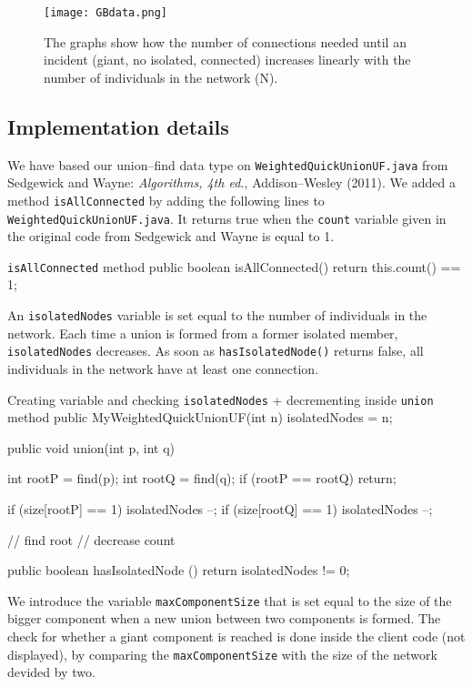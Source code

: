 \documentclass{tufte-handout}
\begin{document}
\begin{figure}
	\texttt{[image: GBdata.png]}
	\caption{The graphs show how the number of connections needed until an incident (giant, no isolated, connected) increases linearly with the number of individuals in the network (N).}
	\label{fig:data}
\end{figure}

\subsection{Implementation details}

We have based our union--find data type on {\tt WeightedQuickUnionUF.java} from Sedgewick and Wayne: {\em Algorithms, 4th ed.}, Addison--Wesley (2011).
We added a method {\tt isAllConnected} by adding the following lines to {\tt WeightedQuickUnionUF.java}. It returns true when the {\tt count} variable given in the original code from Sedgewick and Wayne is equal to 1.

\begin{sexylisting}{{\tt isAllConnected} method}
public boolean isAllConnected() {
    return this.count() == 1; }
\end{sexylisting}

An {\tt isolatedNodes} variable is set equal to the number of individuals in the network.
Each time a union is formed from a former isolated member, {\tt isolatedNodes} decreases.
As soon as {\tt hasIsolatedNode()} returns false, all individuals in the network have at least one connection.

\begin{sexylisting}{Creating variable and checking {\tt isolatedNodes} + decrementing inside {\tt union} method}
public MyWeightedQuickUnionUF(int n) {
    isolatedNodes = n; }

public void union(int p, int q) {
    int rootP = find(p);
    int rootQ = find(q);
    if (rootP == rootQ) return;

    if (size[rootP] == 1) isolatedNodes --;
    if (size[rootQ] == 1) isolatedNodes --;
    
    // find root
    // decrease count }

public boolean hasIsolatedNode () {
    return isolatedNodes != 0; }
\end{sexylisting}

We introduce the variable {\tt maxComponentSize} that is set equal to the size of the bigger component when a new union between two components is formed.
The check for whether a giant component is reached is done inside the client code (not displayed), by comparing the {\tt maxComponentSize} with the size of the network devided by two.
\end{document}
